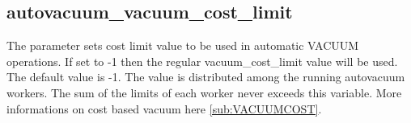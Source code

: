 \subsection{autovacuum\_vacuum\_cost\_limit}
The parameter sets  cost limit value to be used in automatic VACUUM operations. 
If set to -1 then the regular vacuum\_cost\_limit value will be used. The default value is -1.
The value is distributed among the running autovacuum workers. The sum of the limits of each worker 
never exceeds this variable. More informations on cost based vacuum here \ref{sub:VACUUMCOST}.



